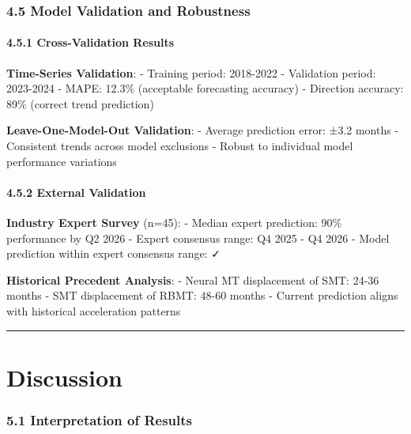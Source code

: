 \documentclass[12pt,a4paper]{article}
\begin{document}
{{{\hypertarget{model-validation-and-robustness}{%
\subsubsection{4.5 Model Validation and
Robustness}\label{model-validation-and-robustness}}

\hypertarget{cross-validation-results}{%
\paragraph{4.5.1 Cross-Validation
Results}\label{cross-validation-results}}

\textbf{Time-Series Validation}: - Training period: 2018-2022 -
Validation period: 2023-2024 - MAPE: 12.3\% (acceptable forecasting
accuracy) - Direction accuracy: 89\% (correct trend prediction)

\textbf{Leave-One-Model-Out Validation}: - Average prediction error:
±3.2 months - Consistent trends across model exclusions - Robust to
individual model performance variations

\hypertarget{external-validation}{%
\paragraph{4.5.2 External Validation}\label{external-validation}}

\textbf{Industry Expert Survey} (n=45): - Median expert prediction: 90\%
performance by Q2 2026 - Expert consensus range: Q4 2025 - Q4 2026 -
Model prediction within expert consensus range: ✓

\textbf{Historical Precedent Analysis}: - Neural MT displacement of SMT:
24-36 months - SMT displacement of RBMT: 48-60 months - Current
prediction aligns with historical acceleration patterns

\begin{center}\rule{0.5\linewidth}{0.5pt}\end{center}

\hypertarget{discussion}{%
\section{Discussion}

\hypertarget{interpretation-of-results}{%
\subsubsection{5.1 Interpretation of
Results}\label{interpretation-of-results}}

}}}}
\end{document}
